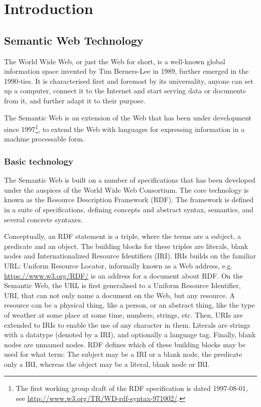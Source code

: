 \chapter{Introduction}

\section{Semantic Web Technology}

The World Wide Web, or just the Web for short, is a well-known global
information space invented by Tim Berners-Lee in 1989, further emerged
in the 1990-ties. It is characterised first and foremost by its
universality, anyone can set up a computer, connect it to the Internet and
start serving data or documents from it, and further adapt it to their purpose. 

The Semantic Web is an extension of the Web that has been under
development since 1997\footnote{The first working group draft of the
  RDF specification is dated 1997-08-01, see
  \url{http://www.w3.org/TR/WD-rdf-syntax-971002/}.}, to extend the
Web with languages for expressing information in a machine processable
form\cite{semwebroadmap}.

\subsection{Basic technology}

The Semantic Web is built on a number of specifications that has been
developed under the auspices of the World Wide Web Consortium. The
core technology is known as the Resource Description Framework
(RDF). The framework is defined in a suite of specifications, defining
concepts and abstract syntax, semantics, and several concrete
syntaxes.

Conceptually, an RDF statement is a triple, where the terms are a
subject, a predicate and an object. The building blocks for these
triples are literals, blank nodes and Internationalized Resource
Identifiers (IRI). IRIs builds on the familiar URL: Uniform Resource
Locator, informally known as a Web address,
e.g. \url{https://www.w3.org/RDF/} is an address for a document about
RDF. On the Semantic Web, the URL is first generalised to a Uniform
Resource Identifier, URI, that can not only name a document on the
Web, but any resource. A resource can be a physical thing, like a
person, or an abstract thing, like the type of weather at some place
at some time, numbers, strings, etc. Then, URIs are extended to IRIs
to enable the use of any character in them. Literals are strings with
a datatype (denoted by a IRI), and optionally a language tag. Finally,
blank nodes are unnamed nodes. RDF defines which of these building
blocks may be used for what term: The subject may be a IRI or a blank
node, the predicate only a IRI, whereas the object may be a literal,
blank node or IRI.

